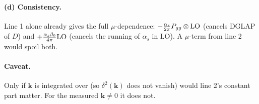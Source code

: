 \documentclass[10pt]{article}
\numberwithin{equation}{section}
\newcommand{\LO}{{\rm LO}}
\begin{document}
\paragraph{(d) Consistency.} Line 1 alone already gives the full $\mu$-dependence: $-\frac{\alpha_s}{2\pi}P_{gg}\otimes\LO$ (cancels DGLAP of $D$) and $+\frac{\alpha_s\beta_0}{4\pi}\LO$ (cancels the running of $\alpha_s$ in LO). A $\mu$-term from line 2 would spoil both.

\paragraph{Caveat.} Only if $\mathbf k$ is integrated over (so $\delta^2(\mathbf k)$ does not vanish) would line 2's constant part matter. For the measured $\mathbf k\neq0$ it does not.
\end{document}
